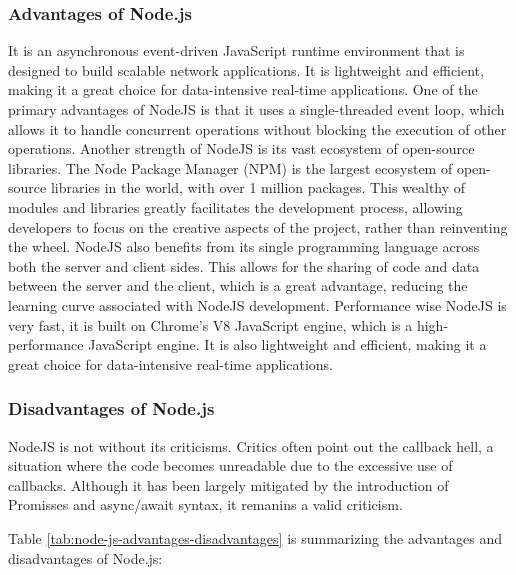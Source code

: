 \subsubsection*{Advantages of Node.js}
It is an asynchronous event-driven JavaScript runtime environment that is designed to build scalable network applications. It is lightweight and efficient, making it a great choice for data-intensive real-time applications.\cite{tilkov}
One of the primary advantages of NodeJS is that it uses a single-threaded event loop, which allows it to handle concurrent operations without blocking the execution of other operations.
Another strength of NodeJS is its vast ecosystem of open-source libraries. The Node Package Manager (NPM) is the largest ecosystem of open-source libraries in the world, with over 1 million packages. \cite{npm} This
wealthy of modules and libraries greatly facilitates the development process, allowing developers to focus on the creative aspects of the project, rather than reinventing the wheel.
NodeJS also benefits from its single programming language across both the server and client sides. This allows for the sharing of code and data between the server and the client, which is a great advantage, reducing the learning curve associated with NodeJS development. \cite{tilkov}
Performance wise NodeJS is very fast, it is built on Chrome's V8 JavaScript engine, which is a high-performance JavaScript engine. It is also lightweight and efficient, making it a great choice for data-intensive real-time applications. \cite{tilkov}

\subsubsection*{Disadvantages of Node.js}
NodeJS is not without its criticisms. Critics often point out the callback hell, a situation where the code becomes unreadable due to the excessive use of callbacks. Although it has been largely mitigated by the introduction of Promisses and async/await syntax, it remanins a valid criticism. \cite{cantelon2014node}

Table \ref{tab:node-js-advantages-disadvantages} is summarizing the advantages and disadvantages of Node.js\cite{tilkov}:

